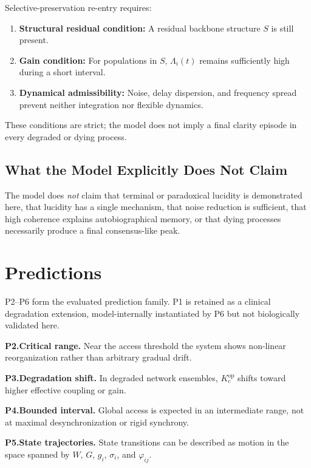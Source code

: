 \documentclass[11pt,a4paper]{article}
\theoremstyle{plain}
\theoremstyle{definition}
\theoremstyle{remark}
\newcommand{\Kcop}{K_c^{\mathrm{op}}}
\begin{document}
Selective-preservation re-entry requires:

\begin{enumerate}
\item \textbf{Structural residual condition:} A residual backbone structure $S$ is still present.
\item \textbf{Gain condition:} For populations in $S$, $\Lambda_i(t)$ remains sufficiently high during a short interval.
\item \textbf{Dynamical admissibility:} Noise, delay dispersion, and frequency spread prevent neither integration nor flexible dynamics.
\end{enumerate}

These conditions are strict; the model does not imply a final clarity episode in every degraded or dying process.

\subsection{What the Model Explicitly Does Not Claim}

The model does \emph{not} claim that terminal or paradoxical lucidity is demonstrated here, that lucidity has a single mechanism, that noise reduction is sufficient, that high coherence explains autobiographical memory, or that dying processes necessarily produce a final consensus-like peak.


\section{Predictions}
\label{sec:predictions}
\label{sec:vorhersagen}

P2--P6 form the evaluated prediction family. P1 is retained as a clinical degradation extension, model-internally instantiated by P6 but not biologically validated here.

\medskip
\noindent\textbf{P2.\;Critical range.}\quad
Near the access threshold the system shows non-linear reorganization rather than arbitrary gradual drift.

\medskip
\noindent\textbf{P3.\;Degradation shift.}\quad
In degraded network ensembles, $\Kcop$ shifts toward higher effective coupling or gain.

\medskip
\noindent\textbf{P4.\;Bounded interval.}\quad
Global access is expected in an intermediate range, not at maximal desynchronization or rigid synchrony.

\medskip
\noindent\textbf{P5.\;State trajectories.}\quad
State transitions can be described as motion in the space spanned by $W$, $G$, $g_i$, $\sigma_i$, and $\varphi_{ij}$.
\end{document}
